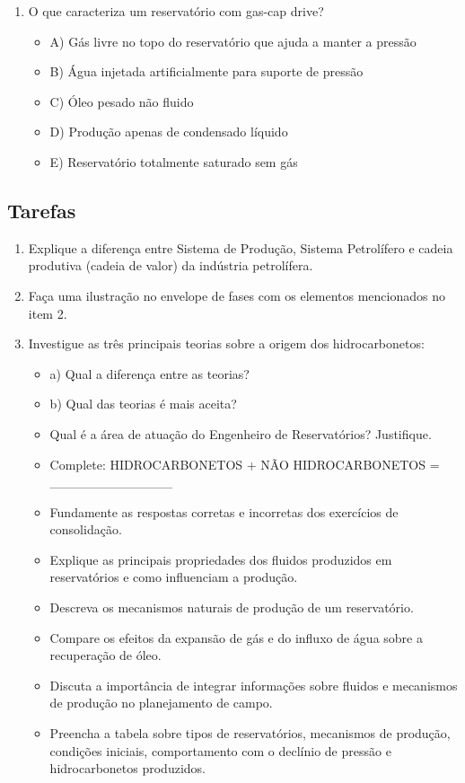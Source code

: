 \documentclass[11pt,a4paper]{article}
\begin{document}
\begin{enumerate}
\item O que caracteriza um reservatório com gas-cap drive?
\begin{itemize}
\item A) Gás livre no topo do reservatório que ajuda a manter a pressão
\item B) Água injetada artificialmente para suporte de pressão
\item C) Óleo pesado não fluido
\item D) Produção apenas de condensado líquido
\item E) Reservatório totalmente saturado sem gás
\end{itemize}
\end{enumerate}

\subsection{Tarefas}
\begin{enumerate}
\item Explique a diferença entre Sistema de Produção, Sistema Petrolífero e cadeia produtiva (cadeia de valor) da indústria petrolífera.
\item Faça uma ilustração no envelope de fases com os elementos mencionados no item 2.
\item Investigue as três principais teorias sobre a origem dos hidrocarbonetos:
\begin{itemize}
\item a) Qual a diferença entre as teorias?
\item b) Qual das teorias é mais aceita?
\item Qual é a área de atuação do Engenheiro de Reservatórios? Justifique.
\item Complete: HIDROCARBONETOS + NÃO HIDROCARBONETOS = _____________
\item Fundamente as respostas corretas e incorretas dos exercícios de consolidação.
\item Explique as principais propriedades dos fluidos produzidos em reservatórios e como influenciam a produção.
\item Descreva os mecanismos naturais de produção de um reservatório.
\item Compare os efeitos da expansão de gás e do influxo de água sobre a recuperação de óleo.
\item Discuta a importância de integrar informações sobre fluidos e mecanismos de produção no planejamento de campo.
\item Preencha a tabela sobre tipos de reservatórios, mecanismos de produção, condições iniciais, comportamento com o declínio de pressão e hidrocarbonetos produzidos.
\end{itemize}
\end{enumerate}
\end{document}
